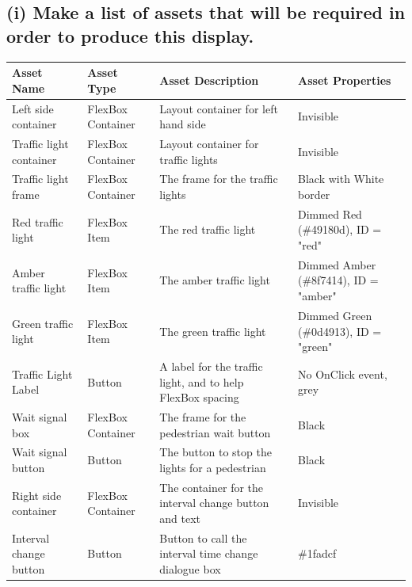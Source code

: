 \documentclass[a4paper]{article}
\begin{document}
\subsection{(i) Make a list of assets that will be required in order to produce this display.}
\begin{center}
\begin{tabular}{ | m{9em} | m{10em} | m{15em} | m{8em} | }
  \hline
  Asset Name & Asset Type & Asset Description & Asset Properties	\\ [0.5ex] 
  \hline \hline	
  Left side container & FlexBox Container & Layout container for left hand side & Invisible \\
  \hline
  Traffic light container & FlexBox Container & Layout container for traffic lights & Invisible \\
  \hline
  Traffic light frame & FlexBox Container & The frame for the traffic lights & Black with White border \\
  \hline
  Red traffic light & FlexBox Item & The red traffic light & Dimmed Red (\#49180d), ID = "red" \\
  \hline
  Amber traffic light & FlexBox Item & The amber traffic light & Dimmed Amber (\#8f7414), ID = "amber" \\
	\hline
	Green traffic light & FlexBox Item & The green traffic light & Dimmed Green (\#0d4913), ID = "green" \\
	\hline
	Traffic Light Label & Button & A label for the traffic light, and to help FlexBox spacing & No OnClick event, grey \\
	\hline
	Wait signal box & FlexBox Container & The frame for the pedestrian wait button & Black \\
	\hline
	Wait signal button & Button & The button to stop the lights for a pedestrian & Black \\
	\hline
	Right side container & FlexBox Container & The container for the interval change button and text & Invisible \\
	\hline
	Interval change button & Button & Button to call the interval time change dialogue box & \#1fadcf \\
	\hline
\end{tabular}
\end{center}
\end{document}
